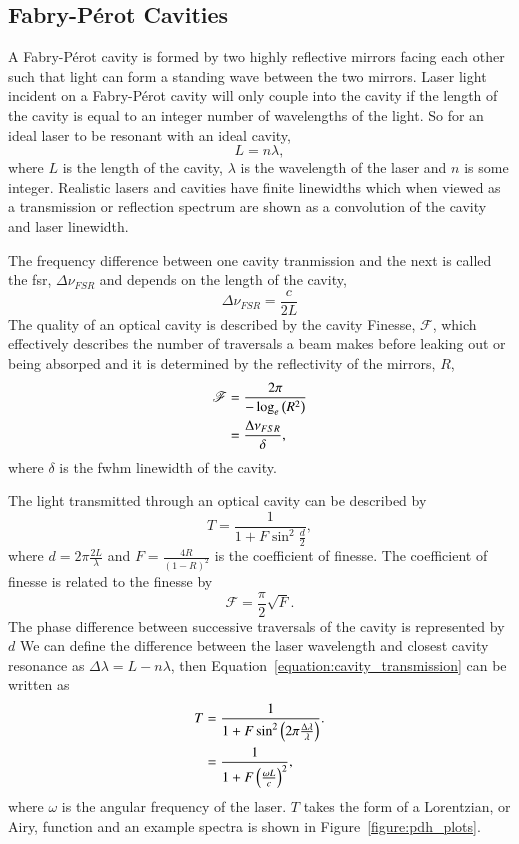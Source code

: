 \subsection{Fabry-P\'erot Cavities}\label{section:cavity_theory}
A Fabry-P\'erot cavity is formed by two highly reflective mirrors facing each other such that light can form a standing wave between the two mirrors.
Laser light incident on a Fabry-P\'erot cavity will only couple into the cavity if the length of the cavity is equal to an integer number of wavelengths of the light.
So for an ideal laser to be resonant with an ideal cavity,
\begin{equation}
L = n \lambda,
\end{equation}
where $L$ is the length of the cavity, $\lambda$ is the wavelength of the laser and $n$ is some integer.
Realistic lasers and cavities have finite linewidths which when viewed as a transmission or reflection spectrum are shown as a convolution of the cavity and laser linewidth.

The frequency difference between one cavity tranmission and the next is called the \gls{fsr}, $\Delta \nu_{FSR}$ and depends on the length of the cavity,
\begin{equation}
\Delta \nu_{FSR} = \frac{c}{2L}
\end{equation}
The quality of an optical cavity is described by the cavity Finesse, $\mathscr{F}$, which effectively describes the number of traversals a beam makes before leaking out or being absorped and it is determined by the reflectivity of the mirrors, $R$,
\begin{align}
\mathscr{F} &= \frac{2\pi}{-\log_e\left(R^2\right)} \notag\\
 &= \frac{\Delta \nu_{FSR}}{\delta},
\end{align}
where $\delta$ is the \gls{fwhm} linewidth of the cavity.

The light transmitted through an optical cavity can be described by~\cite{pedrotti_introduction_2007}
\begin{equation}\label{equation:cavity_transmission}
T = \frac{1}{1+F\sin^2\frac{d}{2}},
\end{equation}
where $d=2\pi\frac{2L}{\lambda}$ and $F=\frac{4R}{\left(1-R\right)^2}$ is the coefficient of finesse.
The coefficient of finesse is related to the finesse by
\begin{equation}
\mathscr{F}=\frac{\pi}{2}\sqrt{F}.
\end{equation}
The phase difference between successive traversals of the cavity is represented by $d$
We can define the difference between the laser wavelength and closest cavity resonance as $\Delta\lambda=L-n\lambda$, then Equation~\ref{equation:cavity_transmission} can be written as
\begin{align}\label{equation:cavity_transmission2}
T &= \frac{1}{1+F\sin^2\left(2\pi\frac{\Delta\lambda}{\lambda}\right)}. \notag \\
&= \frac{1}{1+F\left(\frac{\omega L}{c}\right)^2},
\end{align}
where $\omega$ is the angular frequency of the laser.
$T$ takes the form of a Lorentzian, or Airy, function and an example spectra is shown in Figure~\ref{figure:pdh_plots}.

